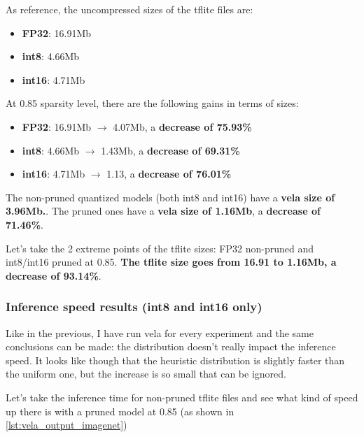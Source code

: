 As reference, the uncompressed sizes of the tflite files are:
\begin{itemize}
    \item \textbf{FP32}: 16.91Mb
    \item \textbf{int8}: 4.66Mb
    \item \textbf{int16}: 4.71Mb
\end{itemize}

At 0.85 sparsity level, there are the following gains in terms of sizes:
\begin{itemize}
    \item \textbf{FP32}: 16.91Mb $\rightarrow$ 4.07Mb, a \textbf{decrease of 75.93\%}
    \item \textbf{int8}: 4.66Mb $\rightarrow$ 1.43Mb, a \textbf{decrease of 69.31\%}
    \item \textbf{int16}: 4.71Mb $\rightarrow$ 1.13, a \textbf{decrease of 76.01\%}
\end{itemize}

The non-pruned quantized models (both int8 and int16) have a \textbf{vela size
of 3.96Mb.}. The pruned ones have a \textbf{vela size of 1.16Mb}, a \textbf{
decrease of 71.46\%}.

Let's take the 2 extreme points of the tflite sizes: FP32 non-pruned and
int8/int16 pruned at 0.85. \textbf{The tflite size goes from 16.91 to 1.16Mb,
a decrease of 93.14\%}.

\subsubsection{Inference speed results (int8 and int16 only)}
Like in the previous, I have run vela for every experiment and the same
conclusions can be made: the distribution doesn't really impact the inference
speed.
It looks like though that the heuristic distribution is slightly faster than
the uniform one, but the increase is so small that can be ignored.

Let's take the inference time for non-pruned tflite files and see what kind of
speed up there is with a pruned model at 0.85 (as shown in
\autoref{lst:vela_output_imagenet})

